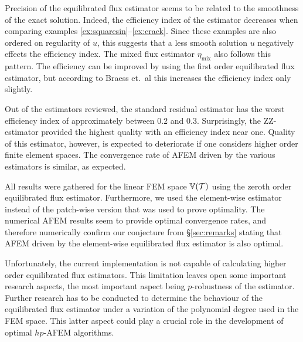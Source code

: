 \documentclass[thesis.tex]{subfiles}
\begin{document}
Precision of the equilibrated flux estimator seems to be related to the smoothness of the exact solution. Indeed, the efficiency
index of the estimator decreases when comparing examples \ref{ex:squaresin}--\ref{ex:crack}.
Since these examples are also ordered on regularity of $u$, this suggests that a less smooth solution $u$ negatively
effects the efficiency index. The mixed flux estimator $\eta_{\text{mix}}$ also follows this pattern. The efficiency
can be improved by using the first order equilibrated flux estimator, but according to Braess et.~al \cite{braessequilrobust} this
increases the efficiency index only slightly.

Out of the estimators reviewed, the standard residual estimator has the worst efficiency index of approximately between $0.2$ and $0.3$.
Surprisingly, the ZZ-estimator provided the highest quality with an efficiency index near one. Quality of this estimator, however, is expected
to deteriorate if one considers higher order finite element spaces.
The convergence rate of AFEM driven by the various estimators is similar, as expected.

All results were gathered for the linear FEM space $\mathbb{V}(\mathcal{T})$ using the zeroth order equilibrated flux estimator. 
Furthermore, we used the element-wise estimator instead of the patch-wise version that was used to prove optimality. 
The numerical AFEM results
seem to provide optimal convergence rates, and therefore numerically confirm our conjecture from \S\ref{sec:remarks} stating
that AFEM driven by the element-wise equilibrated flux estimator is also optimal.

Unfortunately, the current implementation is not capable of calculating higher order equilibrated flux estimators. This limitation
leaves open some important research aspects, the most important aspect being $p$-robustness of the estimator.
Further research has to be conducted to determine the behaviour
 of the equilibrated flux estimator under a variation of the polynomial degree used in the FEM space. 
 This latter aspect could play a crucial role in the development of optimal $hp$-AFEM algorithms.
\end{document}
